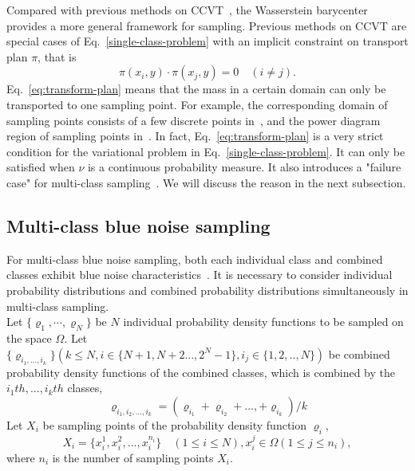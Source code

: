 Compared with previous methods on CCVT~\cite{balzer:2009:capacity,de:2012:blue},
the Wasserstein barycenter provides a more general framework for sampling.
Previous methods on CCVT are special cases of Eq.~\ref{single-class-problem} with an implicit constraint on  transport plan $\pi$,
that is
\begin{equation}\label{eq:transform-plan}
  \pi(x_i,y)\cdot\pi(x_j,y)=0 \quad(i\neq j).
\end{equation}
Eq.~\ref{eq:transform-plan} means that the mass in a certain domain can only be transported to one sampling point.
For example,
the corresponding domain of sampling points consists of a few discrete points in~\cite{balzer:2009:capacity},
and the power diagram region of sampling points in~\cite{de:2012:blue}.
In fact,
Eq.~\ref{eq:transform-plan} is a very strict condition for the variational problem in Eq.~\ref{single-class-problem}.
It can only be satisfied when $\nu$ is a continuous probability measure.
It also introduces a "failure case" for multi-class sampling~\cite{wei:2010:multi}.
We will discuss the reason in the next subsection.

\subsection{Multi-class blue noise sampling}
For multi-class blue noise sampling,
both each individual class and combined classes exhibit blue noise characteristics~\cite{wei:2010:multi}.
It is necessary to consider individual probability distributions and combined probability distributions simultaneously
in multi-class sampling. \\
Let $\{\varrho_1,\cdots,\varrho_N\}$ be $N$ individual probability density functions
to be sampled on the space $\Omega$.
Let $\{\varrho_{{i}_1,...,i_k}\}(k\leq N, i\in\{N+1,N+2...,2^N-1\},i_j\in\{1,2,..,N\})$
be combined probability density functions of the combined classes,
which is combined by  the $i_1th,...,i_kth$ classes,
\begin{equation*}
    \varrho_{i_1,i_2,...,i_k}=(\varrho_{i_1}+\varrho_{i_2}+...,+\varrho_{i_k})/k
\end{equation*}
Let $X_i$ be sampling points of the probability density function $\varrho_i$,
\begin{equation*}
  X_i=\{x_i^1,x_i^2,...,x_i^{n_i}\}\quad(1\leq i\leq N), x_i^j\in\Omega(1\leq j\leq n_i),
\end{equation*}
where $n_i$ is the number of sampling points $X_i$.

